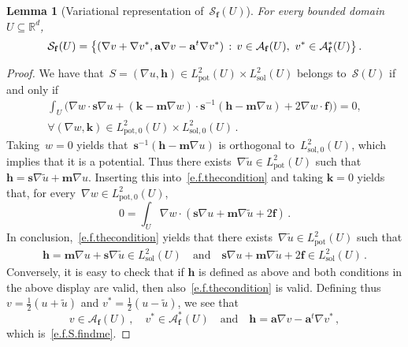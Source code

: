 \documentclass[11pt]{article} %
\numberwithin{equation}{section}
\newtheorem{lemma}[theorem]{Lemma}
\theoremstyle{definition}
\let\originalleft\left
\let\originalright\right
\renewcommand{\left}{\mathopen{}\mathclose\bgroup\originalleft}
\renewcommand{\right}{\aftergroup\egroup\originalright}
\newcommand*{\Rd}{\ensuremath{\mathbb{R}^d}}
\renewcommand*{\tilde}{\widetilde}
\newcommand{\qand}{\quad \mbox{and} \quad }
\newcommand{\f}{\mathbf{f}}
\newcommand{\s}{\mathbf{s}}
\renewcommand{\a}{\mathbf{a}}
\newcommand{\m}{\mathbf{m}}
\renewcommand{\S}{\mathcal{S}}
\newcommand{\A}{\mathcal{A}}
\newcommand{\Lsol}{L^2_{\mathrm{sol}}}
\newcommand{\Lsolo}{L^2_{\mathrm{sol,0}}}
\newcommand{\Lpot}{L^2_{\mathrm{pot}}}
\newcommand{\Lpoto}{L^2_{\mathrm{pot,0}}}
\begin{document}
\begin{lemma}[Variational representation of~$\mathcal{S}_\f(U)$]
\label{l.f.S.findme}
For every bounded domain~$U\subseteq\Rd$,
\begin{equation}
\label{e.f.S.findme}
\S_\f(U)
=
\left\{ (\nabla v+\nabla v^*, \a\nabla v - \a^t\nabla v^*) \,:\, v\in \A_\f(U), \ v^*\in \A_\f^*(U)
\right\}
\,.
\end{equation}
\end{lemma}
\begin{proof}
We have that~$S=(\nabla u,\mathbf{h}) \in \Lpot(U)\times\Lsol(U)$ belongs to~$\S(U)$ if and only if 
\begin{multline}
\label{e.f.thecondition}
\int_U \bigl(
\nabla w \cdot \s \nabla u + (\mathbf{k}-\m\nabla w) 
\cdot \s^{-1} (\mathbf{h} - \m\nabla u )
+  2 \nabla w \cdot \f )
\bigr) = 0, 
\\
\forall (\nabla w,\mathbf{k}) \in \Lpoto(U) \times \Lsolo(U)\,.
\end{multline}
Taking~$w=0$ yields that~$\s^{-1}(\mathbf{h}-\m\nabla u)$ is orthogonal to~$\Lsolo(U)$, which implies that it is a potential. 
Thus there exists~$\nabla \tilde u \in \Lpot(U)$ such that~$\mathbf{h} = \s \nabla \tilde u + \m\nabla u$. Inserting this into~\eqref{e.f.thecondition} and taking $\mathbf{k}= 0$ yields that, for every~$\nabla w\in \Lpoto(U)$,  
\begin{equation*}
0 
=
\int_U 
\nabla w \cdot ( \s \nabla u +  \m\nabla \tilde u + 2\f )\,.
\end{equation*}
In conclusion,~\eqref{e.f.thecondition} yields that there exists~$\nabla \tilde u \in \Lpot(U)$ such that
\begin{align*}  
\mathbf{h}  = \m \nabla u + \s \nabla \tilde u \in \Lsol(U)
\qand 
\s \nabla u +  \m\nabla \tilde u  + 2\f \in \Lsol(U)
\,.
\end{align*}
Conversely, it is easy to check that if $\mathbf{h}$ is defined as above and both conditions in the above display are valid, then also~\eqref{e.f.thecondition} is valid. Defining thus $v = \frac12(u + \tilde u)$ and $v^* =  \frac12(u - \tilde u)$, 
we see that 
\begin{equation*}
v  \in\A_\f(U) 
\,,\quad
v^* \in\A_\f^*(U)
\quad \mbox{and} \quad
\mathbf{h} = \a\nabla v - \a^t \nabla v^* 
\,,
\end{equation*}
which is~\eqref{e.f.S.findme}. 
\end{proof}
\end{document}
